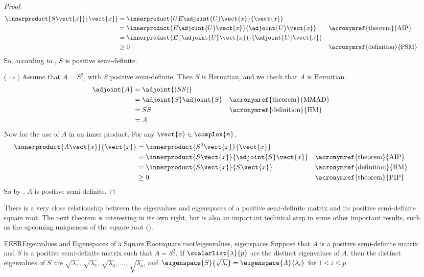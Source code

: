 \begin{proof}
%
\begin{align*}
\innerproduct{S\vect{x}}{\vect{x}}
&=\innerproduct{UE\adjoint{U}\vect{x}}{\vect{x}}\\
&=\innerproduct{E\adjoint{U}\vect{x}}{\adjoint{U}\vect{x}}&&\text{\acronymref{theorem}{AIP}}\\
&=\innerproduct{E\left(\adjoint{U}\vect{x}\right)}{\adjoint{U}\vect{x}}\\
&\geq 0&&\text{\acronymref{definition}{PSM}}
\end{align*}
%
So, according to , $S$ is positive semi-definite.\par
%
($\Rightarrow$)
Assume that $A=S^2$, with $S$ positive semi-definite.  Then $S$ is Hermitian, and we check that $A$ is Hermitian.
%
\begin{align*}
\adjoint{A}
&=\adjoint{\left(SS\right)}\\
&=\adjoint{S}\adjoint{S}&&\text{\acronymref{theorem}{MMAD}}\\
&=SS&&\text{\acronymref{definition}{HM}}\\
&=A
\end{align*}
%
Now for the use of $A$ in an inner product.  For any $\vect{x}\in\complex{n}$,
%
\begin{align*}
\innerproduct{A\vect{x}}{\vect{x}}
&=\innerproduct{S^2\vect{x}}{\vect{x}}\\
&=\innerproduct{S\vect{x}}{\adjoint{S}\vect{x}}&&\text{\acronymref{theorem}{AIP}}\\
&=\innerproduct{S\vect{x}}{S\vect{x}}&&\text{\acronymref{definition}{HM}}\\
&\geq 0&&\text{\acronymref{theorem}{PIP}}
\end{align*}
%
So by , $A$ is positive semi-definite.
%
\end{proof}
%
There is a very close relationship between the eigenvalues and eigenspaces of a positive semi-definite matrix and its positive semi-definite square root.  The next theorem is interesting in its own right, but is also an important technical step in some other important results, such as the upcoming uniqueness of the square root ().
%
\begin{theorem}{EESR}{Eigenvalues and Eigenspaces of a Square Root}{square root!eigenvalues, eigenspaces}
Suppose that $A$ is a positive semi-definite matrix and $S$ is a positive semi-definite matrix such that $A=S^2$.  If $\scalarlist{\lambda}{p}$ are the distinct eigenvalues of $A$, then the distinct eigenvalues of $S$ are $\sqrt{\lambda_1},\,\sqrt{\lambda_2},\,\sqrt{\lambda_3},\,\dots,\,\sqrt{\lambda_p}$, and $\eigenspace{S}{\sqrt{\lambda_i}}=\eigenspace{A}{\lambda_i}$ for $1\leq i\leq p$.
\end{theorem}
